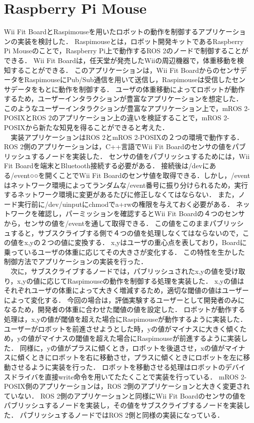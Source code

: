\section{Raspberry Pi Mouse}
Wii Fit BoardとRaspimouseを用いたロボットの動作を制御するアプリケーションの実装を検討した．
Raspimouseとは，ロボット開発キットであるRaspberry Pi Mouseのことで，Raspberry Pi上で動作するROS 2のノードで制御することができる．
Wii Fit Boardは，任天堂が発売したWiiの周辺機器で，体重移動を検知することができる．
このアプリケーションは，Wii Fit BoardからのセンサデータをRaspimouseにPub/Sub通信を用いて送信し，Raspimouseは受信したセンサデータをもとに動作を制御する．
ユーザの体重移動によってロボットが動作するため，ユーザーインタラクションが豊富なアプリケーションを想定した．
このようなユーザーインタラクションが豊富なアプリケーション上で，mROS 2-POSIXとROS 2のアプリケーション上の違いを検証することで，mROS 2-POSIXから新たな知見を得ることができると考えた．
\\　実装アプリケーションはROS 2とmROS 2-POSIXの２つの環境で動作する．
ROS 2側のアプリケーションは，C++言語でWii Fit Boardのセンサの値をパブリッシュするノードを実装した．
センサの値をパブリッシュするためには，Wii Fit Boardを端末とBluetooth接続する必要がある．
接続後は/devにある/event○○を開くことでWii Fit Boardのセンサ値を取得できる．しかし，/eventはネットワーク環境によってランダムな/event番号に振り分けられるため，実行するネットワーク環境に変更があるたびに修正しなくてはならない．
また，ノード実行前に/dev/uinputにchmodでa+rwの権限を与えておく必要がある．
ネットワークを確認し，パーミッションを確認するとWii Fit Boardの４つのセンサから，センサの値を/eventを通して取得できる．
この値をこのままパブリッシュすると，サブスクライブする側で４つの値を処理しなくてはならないので，この値をx,yの２つの値に変換する．
x,yはユーザの重心点を表しており，Boardに乗っているユーザの体重に応じてその大きさが変化する．
この特性を生かした制御方法でアプリケーションの実装を行った．
\\　次に，サブスクライブするノードでは，パブリッシュされたx,yの値を受け取り，x,yの値に応じてRaspimouseの動作を制御する処理を実装した．
x,yの値はそれぞれユーザの体重によって大きく増減するため，適切な閾値の値はユーザーによって変化する．
今回の場合は，評価実験するユーザーとして開発者のみになるため，開発者の体重に合わせた閾値の値を設定した．
ロボットが動作する処理は，x,yの値が閾値を超えた場合にRaspimouseが動作するように実装した．
ユーザーがロボットを前進させようとした時，yの値がマイナスに大きく傾くため，yの値がマイナスの閾値を超えた場合にRaspimouseが前進するように実装した．
同様に，yの値がプラスに傾くとき，ロボットを後退させ，xの値がマイナスに傾くときにロボットを右に移動させ，プラスに傾くときにロボットを左に移動させるように実装を行った．
ロボットを移動させる処理はロボットのデバイスドライバを直接write命令を用いてたたくことで実装を行っている．
mROS 2-POSIX側のアプリケーションは，ROS 2側のアプリケーションと大きく変更されていない．
ROS 2側のアプリケーションと同様にWii Fit Boardのセンサの値をパブリッシュするノードを実装し，その値をサブスクライブするノードを実装した．
パブリッシュするノードではROS 2側と同様の実装になっている．
